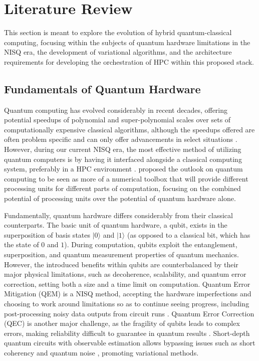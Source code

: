 \section{Literature Review}
This section is meant to explore the evolution of hybrid quantum-classical computing, focusing within the subjects of quantum
hardware limitations in the NISQ era, the development of variational algorithms, and the architecture requirements
for developing the orchestration of HPC within this proposed stack. 

\subsection{Fundamentals of Quantum Hardware} 
Quantum computing has evolved considerably in recent decades, offering potential speedups of polynomial and super-polynomial scales over sets of computationally expensive 
classical algorithms, although the speedups offered are often problem specific and can only offer advancements in select situations \parencite{auyeung2023nphard}. 
However, during our current NISQ era, the most effective method of utilizing quantum computers is by having it interfaced alongside a classical computing system, 
preferably in a HPC environment \parencite{rallis2025interfacingquantumcomputingsystems}. 
\textcite{auyeung2023nphard} proposed the outlook on quantum computing to be seen as more of a numerical toolbox that will
provide different processing units for different parts of computation, focusing on the combined potential of
processing units over the potential of quantum hardware alone. 

Fundamentally, quantum hardware differs considerably from their classical counterparts. 
The basic unit of quantum hardware, a qubit, exists in the superposition of basis states $|0\rangle$ and $|1\rangle$ (as opposed to a classical bit, which has the state of $0$ and $1$). 
During computation, qubits exploit the entanglement, superposition, and quantum measurement properties of quantum mechanics. 
However, the introduced benefits within qubits are counterbalanced by their major physical limitations, such as decoherence, scalability,
and quantum error correction, setting both a size and a time limit on computation. Quantum Error Mitigation (QEM)
is a NISQ method, accepting the hardware imperfections and choosing to work around limitations so as to continue seeing progress, including  
post-processing noisy data outputs from circuit runs \parencite{cai2023quantumerrormitigation}. Quantum Error Correction (QEC) is another major challenge, as the fragility of qubits
leads to complex errors, making reliability difficult to guarantee in quantum results \parencite{oukaira2025quantum}. 
Short-depth quantum circuits with observable estimation allows bypassing issues such as short coherency and quantum noise \parencite{peruzzo2014variational}, promoting variational methods.  

